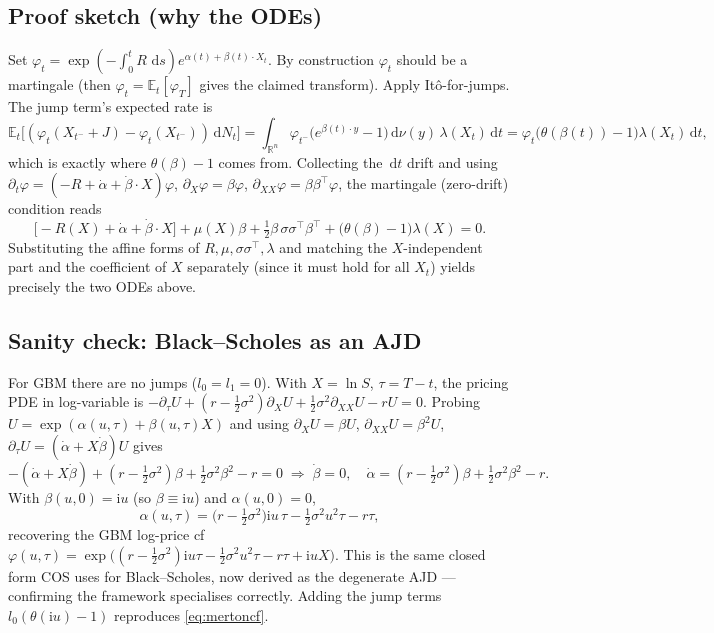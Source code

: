 \documentclass[11pt]{article}
\newcommand{\R}{\mathbb{R}}
\newcommand{\E}{\mathbb{E}}
\newcommand{\ii}{\mathrm{i}}
\newcommand{\dd}{\,\mathrm{d}}
\newcommand{\ch}{\varphi}
\begin{document}
\subsection{Proof sketch (why the ODEs)}
Set $\ch_t=\exp(-\int_0^t R\,\dd s)e^{\alpha(t)+\beta(t)\cdot X_t}$. By construction $\ch_t$ should be a
martingale (then $\ch_t=\E_t[\ch_T]$ gives the claimed transform). Apply It\^o-for-jumps. The jump term's
expected rate is
\[
\E_t\big[(\ch_t(X_{t^-}+J)-\ch_t(X_{t^-}))\dd N_t\big]
=\int_{\R^n}\ch_{t^-}\big(e^{\beta(t)\cdot y}-1\big)\dd\nu(y)\,\lambda(X_t)\dd t
=\ch_t\big(\theta(\beta(t))-1\big)\lambda(X_t)\dd t,
\]
which is exactly where $\theta(\beta)-1$ comes from. Collecting the $\dd t$ drift and using
$\partial_t\ch=(-R+\dot\alpha+\dot\beta\cdot X)\ch$, $\partial_X\ch=\beta\ch$,
$\partial_{XX}\ch=\beta\beta^{\!\top}\ch$, the martingale (zero-drift) condition reads
\[
\big[-R(X)+\dot\alpha+\dot\beta\cdot X\big]+\mu(X)\beta+\tfrac12\beta\,\sigma\sigma^{\!\top}\beta^{\!\top}
+\big(\theta(\beta)-1\big)\lambda(X)=0.
\]
Substituting the affine forms of $R,\mu,\sigma\sigma^{\!\top},\lambda$ and matching the $X$-independent part
and the coefficient of $X$ separately (since it must hold for all $X_t$) yields precisely the two ODEs above.

\subsection{Sanity check: Black--Scholes as an AJD}
For GBM there are no jumps ($l_0=l_1=0$). With $X=\ln S$, $\tau=T-t$, the pricing PDE in log-variable is
$-\partial_\tau U+(r-\tfrac12\sigma^2)\partial_X U+\tfrac12\sigma^2\partial_{XX}U-rU=0$. Probing
$U=\exp(\alpha(u,\tau)+\beta(u,\tau)X)$ and using $\partial_X U=\beta U$, $\partial_{XX}U=\beta^2U$,
$\partial_\tau U=(\dot\alpha+X\dot\beta)U$ gives
\[
-(\dot\alpha+X\dot\beta)+(r-\tfrac12\sigma^2)\beta+\tfrac12\sigma^2\beta^2-r=0
\;\Rightarrow\;
\dot\beta=0,\quad \dot\alpha=(r-\tfrac12\sigma^2)\beta+\tfrac12\sigma^2\beta^2-r.
\]
With $\beta(u,0)=\ii u$ (so $\beta\equiv\ii u$) and $\alpha(u,0)=0$,
\[
\alpha(u,\tau)=\big(r-\tfrac12\sigma^2\big)\ii u\,\tau-\tfrac12\sigma^2u^2\tau-r\tau,
\]
recovering the GBM log-price cf
$\ch(u,\tau)=\exp\big((r-\tfrac12\sigma^2)\ii u\tau-\tfrac12\sigma^2u^2\tau-r\tau+\ii uX\big)$.
This is the same closed form COS uses for Black--Scholes, now derived as the degenerate AJD --- confirming
the framework specialises correctly. Adding the jump terms $l_0(\theta(\ii u)-1)$ reproduces \eqref{eq:mertoncf}.
\end{document}
